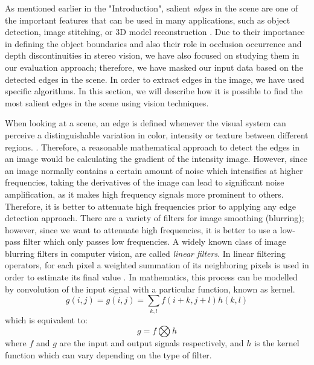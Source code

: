 \documentclass[12pt]{report}
\begin{document}
As mentioned earlier in the "Introduction", salient {\it edges} in the scene are one of the important features 
that can be used in many applications, such as object detection, image stitching, or 3D model reconstruction \cite{sze11}.
Due to their importance in defining the object boundaries and also their role in occlusion occurrence and depth discontinuities in stereo vision, we have also focused on studying them in our
evaluation approach; therefore, we have masked our input data based on the detected edges in the scene. 
In order to extract edges in the image, we have used 
specific algorithms. In this section, we will describe how it is possible to find the most salient edges in the scene using vision techniques.

When looking at a scene, an edge is defined whenever the visual system can perceive a distinguishable variation in color, intensity or texture between 
different regions. \cite{sze11}.
Therefore, a reasonable mathematical approach to detect the edges in an image would be calculating the gradient of the intensity image. However, since an image normally contains a certain amount of
noise which intensifies at higher frequencies, taking the derivatives of the image can lead to significant noise amplification, as it makes high frequency signals more prominent to others.
Therefore, it is better to attenuate high frequencies prior to applying any edge detection approach. 
There are a variety of filters for image smoothing (blurring); however, since we want to attenuate high frequencies, it is better to use a low-pass filter which only passes low frequencies.
A widely known class of image blurring filters in computer vision, are called {\it linear filters}. In linear filtering operators, for each pixel a weighted summation of its neighboring pixels
is used in order to estimate its final value \cite{sze11}. In mathematics, this process can be modelled by convolution of the input signal with a particular function, known as kernel. 
\begin{equation}
g(i,j) = g(i,j)=\sum_{k,l}f(i+k,j+l)h(k,l)
\end{equation}
which is equivalent to:
\begin{equation}
g=f\bigotimes h
\end{equation}
where $f$ and $g$ are the input and output signals respectively, and $h$ is the kernel function which can vary depending on the type of filter. 
\end{document}
